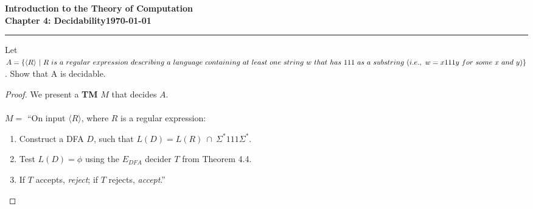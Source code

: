 \documentclass[11pt]{article}
\newcommand{\dated}{\today}
\begin{document}
\textbf{Introduction to the Theory of
Computation}\hfill\textbf{\myname}\\[0.01in]
\textbf{Chapter 4: Decidability}\hfill\textbf{\dated}\\
\smallskip\hrule\bigskip

\begin{problem}{4.16}
Let $A = \{\langle R \rangle \ | \ R \ is \ a \ regular \ expression \ describing \ a \ language \ containing \ at \ least \\ \ one \ string \ w \ that \ has \ 111 \ as \ a \ substring \ (i.e., \ w = x111y \ for \ some \ x \ and \ y)\}$. Show that A is decidable.
\end{problem}

\begin{proof}
We present a \textbf{TM} $M$ that decides $A$.  \\
\\
$M =$ \textquotedblleft On input $\langle R \rangle$, where $R$ is a regular expression:
\begin{enumerate}
\item Construct a DFA $D$, such that $L(D) = L(R) \ \cap \ \Sigma^{*}111\Sigma^{*}$.
\item Test $L(D) = \phi$ using the $E_{DFA}$ decider $T$ from Theorem 4.4.
\item If $T$ accepts, \textit{reject}; if $T$ rejects, \textit{accept}.\textquotedblright
\end{enumerate}
\end{proof}
\end{document}
